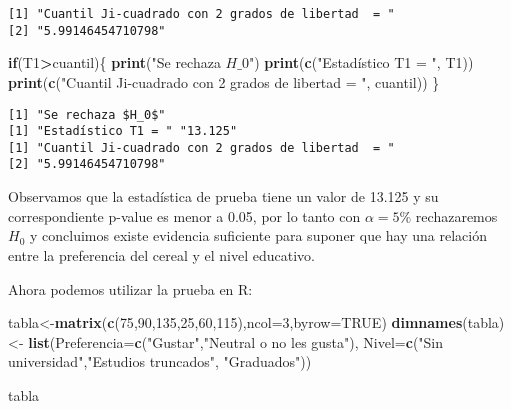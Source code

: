 \documentclass[
  a4paper,
  oneside,
  openany]{book}
\newenvironment{Shaded}{\begin{snugshade}}{\end{snugshade}}
\newcommand{\AttributeTok}[1]{\textcolor[rgb]{0.13,0.29,0.53}{#1}}
\newcommand{\ConstantTok}[1]{\textcolor[rgb]{0.56,0.35,0.01}{#1}}
\newcommand{\ControlFlowTok}[1]{\textcolor[rgb]{0.13,0.29,0.53}{\textbf{#1}}}
\newcommand{\DecValTok}[1]{\textcolor[rgb]{0.00,0.00,0.81}{#1}}
\newcommand{\FunctionTok}[1]{\textcolor[rgb]{0.13,0.29,0.53}{\textbf{#1}}}
\newcommand{\NormalTok}[1]{#1}
\newcommand{\OtherTok}[1]{\textcolor[rgb]{0.56,0.35,0.01}{#1}}
\newcommand{\SpecialCharTok}[1]{\textcolor[rgb]{0.81,0.36,0.00}{\textbf{#1}}}
\newcommand{\StringTok}[1]{\textcolor[rgb]{0.31,0.60,0.02}{#1}}
\begin{document}
\begin{verbatim}
[1] "Cuantil Ji-cuadrado con 2 grados de libertad  = "
[2] "5.99146454710798"                                
\end{verbatim}

\begin{Shaded}
\begin{Highlighting}[]
\ControlFlowTok{if}\NormalTok{(T1}\SpecialCharTok{\textgreater{}}\NormalTok{cuantil)\{}
  \FunctionTok{print}\NormalTok{(}\StringTok{"Se rechaza $H\_0$"}\NormalTok{)}
  \FunctionTok{print}\NormalTok{(}\FunctionTok{c}\NormalTok{(}\StringTok{"Estadístico T1 = "}\NormalTok{, T1))}
  \FunctionTok{print}\NormalTok{(}\FunctionTok{c}\NormalTok{(}\StringTok{"Cuantil Ji{-}cuadrado con 2 grados de libertad  = "}\NormalTok{, cuantil))}
\NormalTok{\}}
\end{Highlighting}
\end{Shaded}

\begin{verbatim}
[1] "Se rechaza $H_0$"
[1] "Estadístico T1 = " "13.125"           
[1] "Cuantil Ji-cuadrado con 2 grados de libertad  = "
[2] "5.99146454710798"                                
\end{verbatim}

Observamos que la estadística de prueba tiene un valor de 13.125 y su correspondiente p-value es menor a 0.05, por lo tanto con \(\alpha=5\%\) rechazaremos \(H_0\) y concluimos existe evidencia suficiente para suponer que hay una relación entre la preferencia del cereal y el nivel
educativo.

Ahora podemos utilizar la prueba en R:

\begin{Shaded}
\begin{Highlighting}[]
\NormalTok{tabla}\OtherTok{\textless{}{-}}\FunctionTok{matrix}\NormalTok{(}\FunctionTok{c}\NormalTok{(}\DecValTok{75}\NormalTok{,}\DecValTok{90}\NormalTok{,}\DecValTok{135}\NormalTok{,}\DecValTok{25}\NormalTok{,}\DecValTok{60}\NormalTok{,}\DecValTok{115}\NormalTok{),}\AttributeTok{ncol=}\DecValTok{3}\NormalTok{,}\AttributeTok{byrow=}\ConstantTok{TRUE}\NormalTok{)}
\FunctionTok{dimnames}\NormalTok{(tabla)}\OtherTok{\textless{}{-}} \FunctionTok{list}\NormalTok{(}\AttributeTok{Preferencia=}\FunctionTok{c}\NormalTok{(}\StringTok{"Gustar"}\NormalTok{,}\StringTok{"Neutral o no les gusta"}\NormalTok{), }\AttributeTok{Nivel=}\FunctionTok{c}\NormalTok{(}\StringTok{"Sin universidad"}\NormalTok{,}\StringTok{"Estudios truncados"}\NormalTok{,}
                      \StringTok{"Graduados"}\NormalTok{))}


\NormalTok{tabla}
\end{Highlighting}
\end{Shaded}
\end{document}
